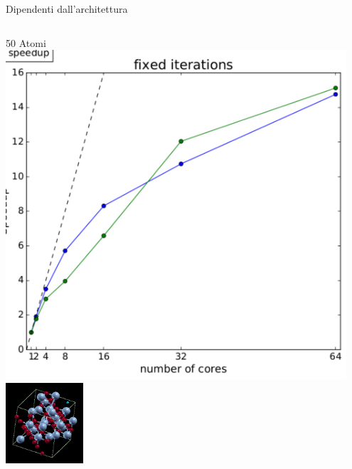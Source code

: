 \documentclass[8pt]{beamer}
\begin{document}
\begin{frame}{Dipendenti dall'architettura}


	\begin{columns}
	\begin{center}	
		50 Atomi\\
		\includegraphics[width=0.95\textwidth]{beam_concl_co3.pdf}	\\		
		\includegraphics[height=3cm]{beam_co3.png}
	\end{center}


\end{columns}
\end{frame}
\end{document}
